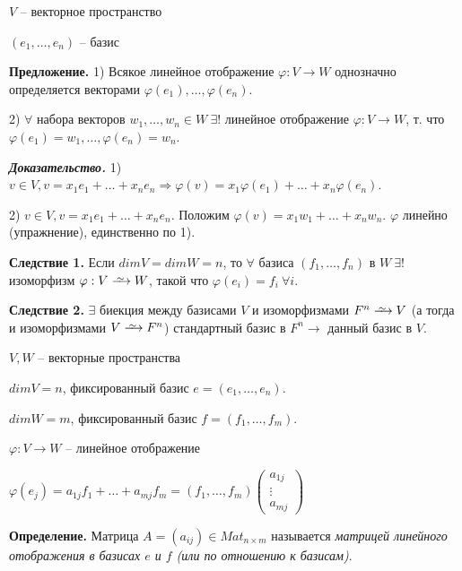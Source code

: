 \vspace{\baselineskip}
$V$ -- векторное пространство

$(e_1, \dots, e_n)$ -- базис

\vspace{\baselineskip}
\textbf{Предложение.} 1) Всякое линейное отображение $\varphi : V \rightarrow W$ однозначно определяется векторами $\varphi(e_1), \dots, \varphi(e_n)$.

2) $\forall$ набора векторов $w_1, \dots, w_n \in W \ \exists !$ линейное отображение $\varphi : V \rightarrow W$, т. что $\varphi(e_1) = w_1, \dots, \varphi(e_n) = w_n$.

\vspace{\baselineskip}
\textbf{\textit{Доказательство.}} 1) $v \in V, v = x_1 e_1 + \dots + x_n e_n \Rightarrow \varphi(v) = x_1 \varphi (e_1) + \dots + x_n \varphi (e_n)$.

2) $v \in V, v = x_1 e_1 + \dots + x_n e_n$. Положим $\varphi (v) = x_1 w_1 + \dots + x_n w_n$. $\varphi$ линейно (упражнение), единственно по 1).

\vspace{\baselineskip}
\textbf{Следствие 1.} Если $dimV = dimW = n$, то $\forall$ базиса $(f_1, \dots, f_n)$ в $W \ \exists !$ изоморфизм $\varphi : V \iso W$, такой что $\varphi (e_i) = f_i \ \forall i$.

\vspace{\baselineskip}
\textbf{Следствие 2.} $\exists$ биекция между базисами $V$ и изоморфизмами $F^n \iso V$ (а тогда и изоморфизмами $V \iso F^n$) стандартный базис в $F^n \rightarrow$ данный базис в $V$.

\vspace{\baselineskip}
$V, W$ -- векторные пространства

$dimV = n$, фиксированный базис $e = (e_1, \dots, e_n)$.

$dimW = m$, фиксированный базис $f = (f_1, \dots, f_m)$.

$\varphi : V \rightarrow W$ -- линейное отображение

$\varphi(e_j) = a_{1j} f_1 + \dots + a_{mj} f_m = (f_1, \dots, f_m) \begin{pmatrix} a_{1j} \\ \vdots \\ a_{mj} \end{pmatrix}$

\vspace{\baselineskip}
\textbf{Определение.} Матрица $A = (a_{ij}) \in Mat_{n \times m}$ называется \textit{матрицей линейного отображения в базисах $e$ и $f$ (или по отношению к базисам)}.


